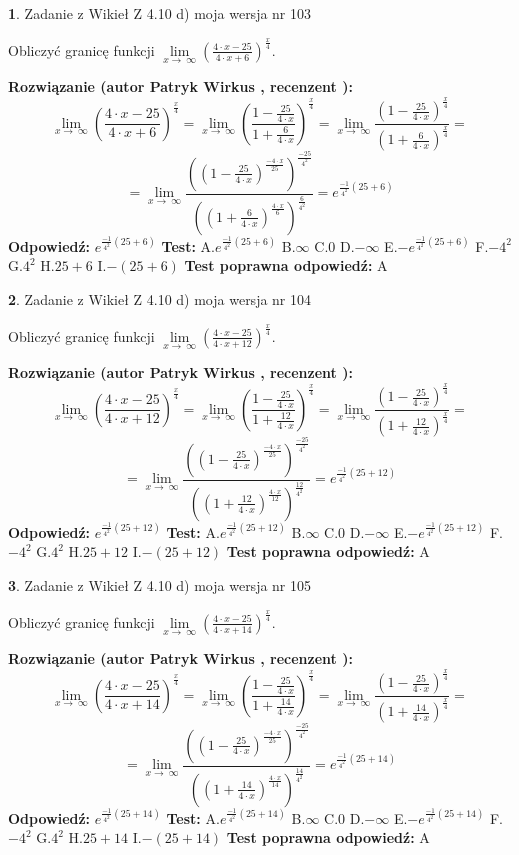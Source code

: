 \documentclass[12pt, a4paper]{article}
\theoremstyle{definition} %
\newtheorem{zad}{}
\newcommand{\zadStart}[1]{\begin{zad}#1\newline}
\newcommand{\zadStop}{\end{zad}}
\newcommand{\rozwStart}[2]{\noindent \textbf{Rozwiązanie (autor #1 , recenzent #2): }\newline}
\newcommand{\rozwStop}{\newline}
\newcommand{\odpStart}{\noindent \textbf{Odpowiedź:}\newline}
\newcommand{\odpStop}{\newline}
\newcommand{\testStart}{\noindent \textbf{Test:}\newline}
\newcommand{\testStop}{\newline}
\newcommand{\kluczStart}{\noindent \textbf{Test poprawna odpowiedź:}\newline}
\newcommand{\kluczStop}{\newline}
\begin{document}
\zadStart{Zadanie z Wikieł Z 4.10 d) moja wersja nr 103}


Obliczyć granicę funkcji  $\lim\limits_{x\to\ \infty}(\frac{4\cdot x-25}{4\cdot x+6})^{\frac{x}{4}}$.
\zadStop
\rozwStart{Patryk Wirkus}{}
$$\lim\limits_{x\to\ \infty}(\frac{4\cdot x-25}{4\cdot x+6})^{\frac{x}{4}} = \lim\limits_{x\to\ \infty}(\frac{1-\frac{25}{4\cdot x}}{1+\frac{6}{4\cdot x}})^{\frac{x}{4}}=\lim\limits_{x\to\ \infty}\frac{(1-\frac{25}{4\cdot x})^{\frac{x}{4}}}{(1+\frac{6}{4\cdot x})^{\frac{x}{4}}}=$$
$$=\lim\limits_{x\to\ \infty}\frac{((1-\frac{25}{4\cdot x})^{\frac{-4\cdot x}{25}})^{\frac{-25}{4^{2}}}}{((1+\frac{6}{4\cdot x})^{\frac{4\cdot x}{6}})^{\frac{6}{4^{2}}}}=e^{\frac{-1}{4^{2}}(25+6)}$$
\rozwStop
\odpStart
$e^{\frac{-1}{4^{2}}(25+6)}$
\odpStop
\testStart
A.$e^{\frac{-1}{4^{2}}(25+6)}$ B.$\infty$ C.$0$ D.$-\infty$ E.$-e^{\frac{-1}{4^{2}}(25+6)}$
F.$-4^{2}$ G.$4^{2}$
H.$25+6$
I.$-(25+6)$
\testStop
\kluczStart
A
\kluczStop



\zadStart{Zadanie z Wikieł Z 4.10 d) moja wersja nr 104}


Obliczyć granicę funkcji  $\lim\limits_{x\to\ \infty}(\frac{4\cdot x-25}{4\cdot x+12})^{\frac{x}{4}}$.
\zadStop
\rozwStart{Patryk Wirkus}{}
$$\lim\limits_{x\to\ \infty}(\frac{4\cdot x-25}{4\cdot x+12})^{\frac{x}{4}} = \lim\limits_{x\to\ \infty}(\frac{1-\frac{25}{4\cdot x}}{1+\frac{12}{4\cdot x}})^{\frac{x}{4}}=\lim\limits_{x\to\ \infty}\frac{(1-\frac{25}{4\cdot x})^{\frac{x}{4}}}{(1+\frac{12}{4\cdot x})^{\frac{x}{4}}}=$$
$$=\lim\limits_{x\to\ \infty}\frac{((1-\frac{25}{4\cdot x})^{\frac{-4\cdot x}{25}})^{\frac{-25}{4^{2}}}}{((1+\frac{12}{4\cdot x})^{\frac{4\cdot x}{12}})^{\frac{12}{4^{2}}}}=e^{\frac{-1}{4^{2}}(25+12)}$$
\rozwStop
\odpStart
$e^{\frac{-1}{4^{2}}(25+12)}$
\odpStop
\testStart
A.$e^{\frac{-1}{4^{2}}(25+12)}$ B.$\infty$ C.$0$ D.$-\infty$ E.$-e^{\frac{-1}{4^{2}}(25+12)}$
F.$-4^{2}$ G.$4^{2}$
H.$25+12$
I.$-(25+12)$
\testStop
\kluczStart
A
\kluczStop



\zadStart{Zadanie z Wikieł Z 4.10 d) moja wersja nr 105}


Obliczyć granicę funkcji  $\lim\limits_{x\to\ \infty}(\frac{4\cdot x-25}{4\cdot x+14})^{\frac{x}{4}}$.
\zadStop
\rozwStart{Patryk Wirkus}{}
$$\lim\limits_{x\to\ \infty}(\frac{4\cdot x-25}{4\cdot x+14})^{\frac{x}{4}} = \lim\limits_{x\to\ \infty}(\frac{1-\frac{25}{4\cdot x}}{1+\frac{14}{4\cdot x}})^{\frac{x}{4}}=\lim\limits_{x\to\ \infty}\frac{(1-\frac{25}{4\cdot x})^{\frac{x}{4}}}{(1+\frac{14}{4\cdot x})^{\frac{x}{4}}}=$$
$$=\lim\limits_{x\to\ \infty}\frac{((1-\frac{25}{4\cdot x})^{\frac{-4\cdot x}{25}})^{\frac{-25}{4^{2}}}}{((1+\frac{14}{4\cdot x})^{\frac{4\cdot x}{14}})^{\frac{14}{4^{2}}}}=e^{\frac{-1}{4^{2}}(25+14)}$$
\rozwStop
\odpStart
$e^{\frac{-1}{4^{2}}(25+14)}$
\odpStop
\testStart
A.$e^{\frac{-1}{4^{2}}(25+14)}$ B.$\infty$ C.$0$ D.$-\infty$ E.$-e^{\frac{-1}{4^{2}}(25+14)}$
F.$-4^{2}$ G.$4^{2}$
H.$25+14$
I.$-(25+14)$
\testStop
\kluczStart
A
\kluczStop
\end{document}
